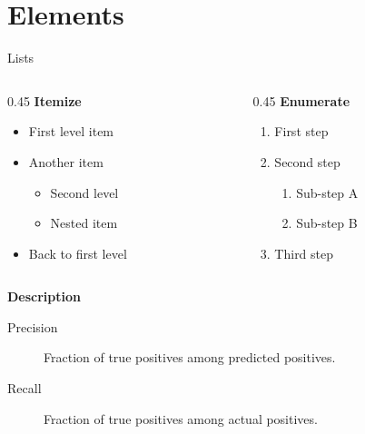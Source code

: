 \documentclass[aspectratio=169]{beamer}
\begin{document}
\section{Elements}


\begin{frame}{Lists}
    \begin{columns}[T]
        \begin{column}{0.45\textwidth}
            \textbf{Itemize}
            \begin{itemize}
                \item First level item
                \item Another item
                    \begin{itemize}
                        \item Second level
                        \item Nested item
                    \end{itemize}
                \item Back to first level
            \end{itemize}
        \end{column}

        \begin{column}{0.45\textwidth}
            \textbf{Enumerate}
            \begin{enumerate}
                \item First step
                \item Second step
                    \begin{enumerate}
                        \item Sub-step A
                        \item Sub-step B
                    \end{enumerate}
                \item Third step
            \end{enumerate}
        \end{column}
    \end{columns}

    \vspace{0.4cm}
    \textbf{Description}
    \begin{description}
        \item[Precision] Fraction of true positives among predicted positives.
        \item[Recall] Fraction of true positives among actual positives.
    \end{description}
\end{frame}
\end{document}
